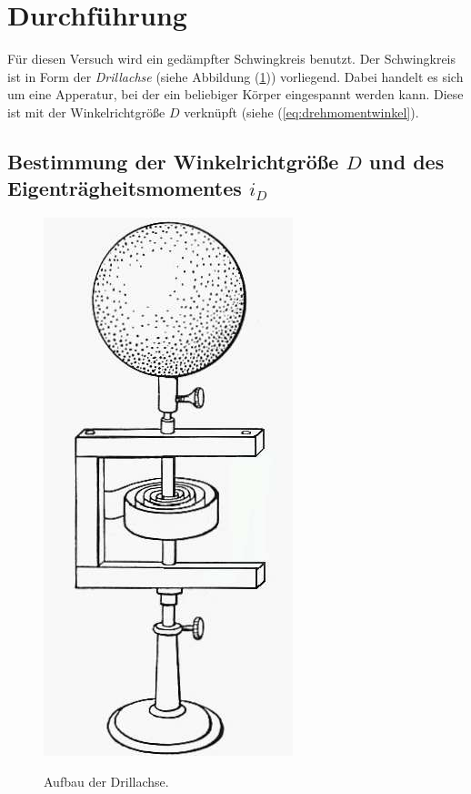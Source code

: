 \section{Durchführung}
\label{sec:Durchführung}

Für diesen Versuch wird ein gedämpfter Schwingkreis benutzt.
Der Schwingkreis ist in Form der \textit{Drillachse} (siehe Abbildung (\ref{fig:drillachse})) vorliegend.
Dabei handelt es sich um eine Apperatur, bei der ein beliebiger Körper eingespannt werden kann.
Diese ist mit der Winkelrichtgröße $D$ verknüpft (siehe (\ref{eq:drehmomentwinkel}).

\subsection{Bestimmung der Winkelrichtgröße $D$ und des Eigenträgheitsmomentes $i_{D}$} \label{subsec:Winkelrichtgröße}

\begin{figure}
    \caption{Aufbau der Drillachse. \cite{v101}}
    \centering
    \includegraphics{pictures/Drillachse.png}
    \label{fig:drillachse}
\end{figure}


